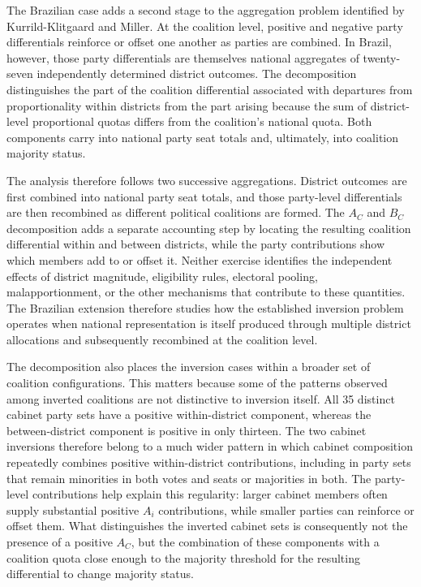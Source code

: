 \documentclass[11pt]{article}
\begin{document}
The Brazilian case adds a second stage to the aggregation problem identified
by Kurrild-Klitgaard and Miller. At the coalition level, positive and negative
party differentials reinforce or offset one another as parties are combined.
In Brazil, however, those party differentials are themselves national
aggregates of twenty-seven independently determined district outcomes. The
decomposition distinguishes the part of the coalition differential associated
with departures from proportionality within districts from the part arising
because the sum of district-level proportional quotas differs from the
coalition's national quota.  Both components carry into national party seat totals and, ultimately, into
coalition majority status.

The analysis therefore follows two successive aggregations. District outcomes
are first combined into national party seat totals, and those party-level
differentials are then recombined as different political coalitions are formed.
The \(A_C\) and \(B_C\) decomposition adds a separate accounting step by locating
the resulting coalition differential within and between districts, while the
party contributions show which members add to or offset it. Neither exercise
identifies the independent effects of district magnitude, eligibility rules,
electoral pooling, malapportionment, or the other mechanisms that contribute to
these quantities. The Brazilian extension therefore studies how the established
inversion problem operates when national representation is itself produced
through multiple district allocations and subsequently recombined at the
coalition level.


The decomposition also places the inversion cases within a broader set of
coalition configurations. This matters because some of the patterns observed
among inverted coalitions are not distinctive to inversion itself. All 35
distinct cabinet party sets have a positive within-district component,
whereas the between-district component is positive in only thirteen. The
two cabinet inversions therefore belong to a much wider pattern in which
cabinet composition repeatedly combines positive within-district
contributions, including in party sets that remain minorities in both votes
and seats or majorities in both. The party-level contributions help explain
this regularity: larger cabinet members often supply substantial positive
\(A_i\) contributions, while smaller parties can reinforce or offset them.
What distinguishes the inverted cabinet sets is consequently not the presence
of a positive \(A_C\), but the combination of these components with a
coalition quota close enough to the majority threshold for the resulting
differential to change majority status.
\end{document}
